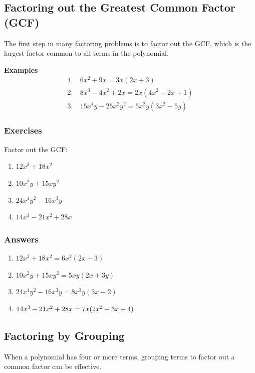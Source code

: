 \documentclass[12pt]{article}
\begin{document}
\subsection*{Factoring out the Greatest Common Factor (GCF)}
The first step in many factoring problems is to factor out the GCF, which is the largest factor common to all terms in the polynomial.

\textbf{Examples}
\begin{align*}
1.\ & 6x^2 + 9x = 3x(2x + 3) \\
2.\ & 8x^3 - 4x^2 + 2x = 2x(4x^2 - 2x + 1) \\
3.\ & 15x^4y - 25x^2y^2 = 5x^2y(3x^2 - 5y)
\end{align*}

\subsubsection*{Exercises}
Factor out the GCF:
\begin{multicols}{2}
\begin{enumerate}
    \item $12x^3 + 18x^2$
    \item $10x^2y + 15xy^2$
    \item $24x^4y^2 - 16x^3y$
    \item $14x^3 - 21x^2 + 28x$
\end{enumerate}
\end{multicols}

\subsubsection*{Answers}
\begin{multicols}{2}
\begin{enumerate}
\item $12x^3 + 18x^2 = 6x^2(2x + 3)$
\item $10x^2y + 15xy^2 = 5xy(2x + 3y)$
\item $24x^4y^2 - 16x^3y = 8x^3y(3x - 2)$
\item $14x^3 - 21x^2 + 28x\\ = 7x(2x^2 - 3x + 4)$
\end{enumerate}
\end{multicols}

\newpage

\subsection*{Factoring by Grouping}
When a polynomial has four or more terms, grouping terms to factor out a common factor can be effective.
\end{document}

